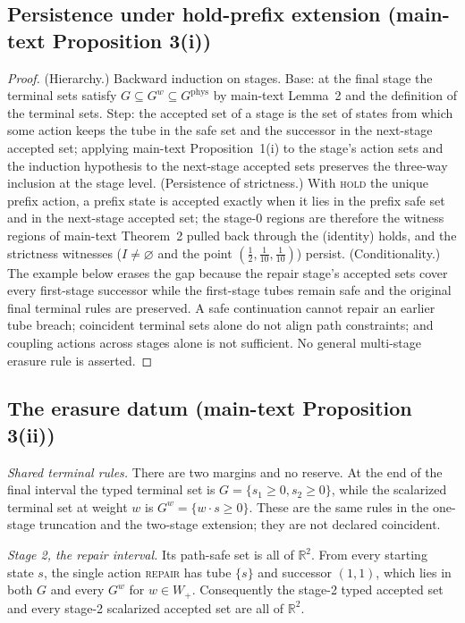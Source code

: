 \documentclass[preprint,11pt,authoryear]{elsarticle}
\theoremstyle{remark}
\newcommand{\Wp}{W_+}
\newcommand{\act}[1]{\textsc{#1}}
\begin{document}
\subsection{Persistence under hold-prefix extension (main-text Proposition 3(i))}

\begin{proof}
(Hierarchy.) Backward induction on stages. Base: at the final stage the terminal sets satisfy $G\subseteq G^w\subseteq G^{\mathrm{phys}}$ by main-text Lemma~2 and the definition of the terminal sets. Step: the accepted set of a stage is the set of states from which some action keeps the tube in the safe set and the successor in the next-stage accepted set; applying main-text Proposition~1(i) to the stage's action sets and the induction hypothesis to the next-stage accepted sets preserves the three-way inclusion at the stage level.
(Persistence of strictness.) With \act{hold} the unique prefix action, a prefix state is accepted exactly when it lies in the prefix safe set and in the next-stage accepted set; the stage-0 regions are therefore the witness regions of main-text Theorem~2 pulled back through the (identity) holds, and the strictness witnesses ($I\neq\varnothing$ and the point $(\tfrac12,\tfrac1{10},\tfrac1{10})$) persist.
(Conditionality.) The example below erases the gap because the repair stage's accepted sets cover every first-stage successor while the first-stage tubes remain safe and the original final terminal rules are preserved. A safe continuation cannot repair an earlier tube breach; coincident terminal sets alone do not align path constraints; and coupling actions across stages alone is not sufficient. No general multi-stage erasure rule is asserted.
\end{proof}

\subsection{The erasure datum (main-text Proposition 3(ii))}\label{si:erasure}

\emph{Shared terminal rules.} There are two margins and no reserve. At the end of the final interval the typed terminal set is $G=\{s_1\ge0,s_2\ge0\}$, while the scalarized terminal set at weight $w$ is $G^w=\{w\cdot s\ge0\}$. These are the same rules in the one-stage truncation and the two-stage extension; they are not declared coincident.

\emph{Stage 2, the repair interval.} Its path-safe set is all of $\mathbb R^2$. From every starting state $s$, the single action \act{repair} has tube $\{s\}$ and successor $(1,1)$, which lies in both $G$ and every $G^w$ for $w\in\Wp$. Consequently the stage-2 typed accepted set and every stage-2 scalarized accepted set are all of $\mathbb R^2$.
\end{document}
